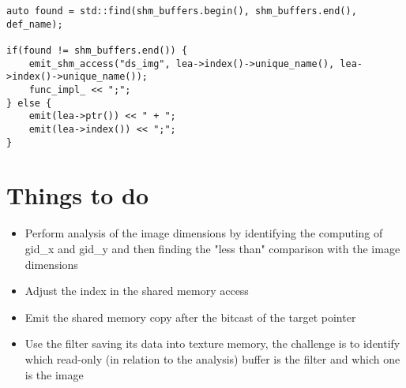 \documentclass{article}
\begin{document}
\begin{verbatim}
auto found = std::find(shm_buffers.begin(), shm_buffers.end(), def_name);

if(found != shm_buffers.end()) {
    emit_shm_access("ds_img", lea->index()->unique_name(), lea->index()->unique_name());
    func_impl_ << ";";
} else { 
    emit(lea->ptr()) << " + ";
    emit(lea->index()) << ";";
}
\end{verbatim}

\section{Things to do}
\begin{itemize}
\item Perform analysis of the image dimensions by identifying the computing of gid\_x and gid\_y and then finding the "less than" comparison with the image dimensions
\item Adjust the index in the shared memory access
\item Emit the shared memory copy after the bitcast of the target pointer
\item Use the filter saving its data into texture memory, the challenge is to identify which read-only (in relation to the analysis) buffer is the filter and which one is the image
\end{itemize}
\end{document}
